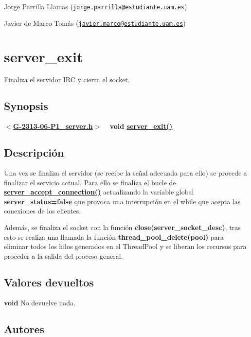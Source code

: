 \begin{DoxyItemize}
\item Jorge Parrilla Llamas (\href{mailto:jorge.parrilla@estudiante.uam.es}{\tt jorge.\+parrilla@estudiante.\+uam.\+es}) 
\item Javier de Marco Tomás (\href{mailto:javier.marco@estudiante.uam.es}{\tt javier.\+marco@estudiante.\+uam.\+es}) 
\end{DoxyItemize}\hypertarget{server_exit}{}\section{server\+\_\+exit}\label{server_exit}
Finaliza el servidor I\+RC y cierra el socket.\hypertarget{server_exit_synopsis6}{}\subsection{Synopsis}\label{server_exit_synopsis6}
{ {\bfseries $<$\hyperlink{G-2313-06-P1__server_8h}{G-\/2313-\/06-\/\+P1\+\_\+server.\+h}$>$} ~\newline
 {\bfseries void \hyperlink{G-2313-06-P1__server_8c_a0e947005d451a8f3bf3af01f54b59f11}{server\+\_\+exit()}} } \hypertarget{server_exit_descripcion6}{}\subsection{Descripción}\label{server_exit_descripcion6}
Una vez se finaliza el servidor (se recibe la señal adecuada para ello) se procede a finalizar el servicio actual. Para ello se finaliza el bucle de {\bfseries \hyperlink{G-2313-06-P1__server_8c_aaac8642d2e699e0f9d942d28a9b233c2}{server\+\_\+accept\+\_\+connection()}} actualizando la variable global {\bfseries server\+\_\+status=false} que provoca una interrupción en el while que acepta las conexiones de los clientes.

Además, se finaliza el socket con la función {\bfseries close(server\+\_\+socket\+\_\+desc)}, tras esto se realiza una llamada la función {\bfseries thread\+\_\+pool\+\_\+delete(pool)} para eliminar todos los hilos generados en el Thread\+Pool y se liberan los recursos para proceder a la salida del proceso general.\hypertarget{server_exit_return6}{}\subsection{Valores devueltos}\label{server_exit_return6}

\begin{DoxyItemize}
\item {\bfseries void} No devuelve nada. 
\end{DoxyItemize}\hypertarget{server_exit_authors6}{}\subsection{Autores}\label{server_exit_authors6}

